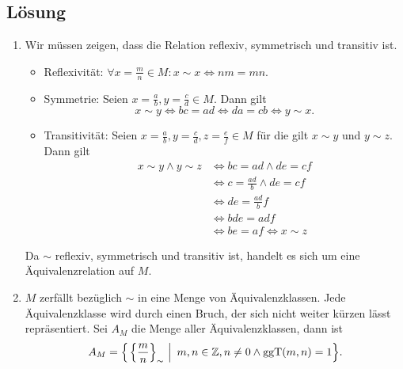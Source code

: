 \documentclass[german,12pt]{homework}
\DeclarePairedDelimiter{\enbrace}{(}{)}
\DeclarePairedDelimiter{\benbrace}{\{}{\}}
\DeclarePairedDelimiter{\penbrace}{\{}{\}}
\begin{document}
    \subsection*{Lösung}
    \begin{enumerate}
        \item Wir müssen zeigen, dass die Relation reflexiv, symmetrisch und transitiv ist.
        \begin{itemize}
    		\item Reflexivität: \({\forall}x = \frac{m}{n} \in M: x \sim x \iff nm = mn\).
    		\item Symmetrie: Seien \(x = \frac{a}{b}, y = \frac{c}{d} \in M\). Dann gilt
    		\[x \sim y \iff bc = ad \iff da = cb \iff y \sim x.\]
    		\item Transitivität: Seien \(x = \frac{a}{b}, y = \frac{c}{d}, z = \frac{e}{f} \in M\) für die gilt \(x \sim y\) und \(y \sim z\). Dann gilt
    		\begin{align*}
    			x \sim y \land y \sim z &\iff bc = ad \land de = cf\\
    			&\iff c = \frac{ad}{b} \land de = cf\\
    			&\iff de = \frac{ad}{b}f\\
    			&\iff bde = adf\\
    			&\iff be = af \iff x \sim z
    		\end{align*}
    	\end{itemize}
    	Da \(\sim\) reflexiv, symmetrisch und transitiv ist, handelt es sich um eine Äquivalenzrelation auf \(M\).
        \item \(M\) zerfällt bezüglich \(\sim\) in eine Menge von Äquivalenzklassen. Jede Äquivalenzklasse wird durch einen Bruch, der sich nicht weiter kürzen lässt repräsentiert. Sei \(A_M\) die Menge aller Äquivalenzklassen, dann ist
    	\[A_M = \penbrace*{\left.\benbrace*{\frac{m}{n}}_\sim\ \right|\ m, n \in \mathbb{Z}, n \ne 0 \land \text{ggT}\enbrace*{m, n} = 1}.\]
    \end{enumerate}
  
\end{document}
